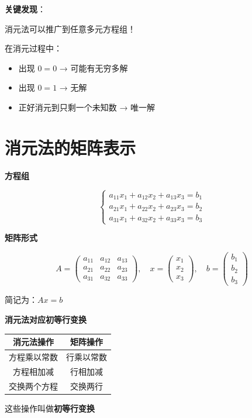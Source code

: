 \documentclass[aspectratio=169,12pt]{beamer}
\begin{document}
\begin{frame}
\pause
\textbf{关键发现}：
\centerline{消元法可以推广到任意多元方程组！}

\bigskip
\pause
在消元过程中：
\begin{itemize}
    \item 出现 $0 = 0$ → 可能有无穷多解
    \item 出现 $0 = 1$ → 无解
    \item 正好消元到只剩一个未知数 → 唯一解
\end{itemize}
\end{frame}

\section{消元法的矩阵表示}

\begin{frame}
\fontsize{10}{12}\selectfont
\centerline{\textbf{方程组}}
\[
\begin{cases}
a_{11}x_1 + a_{12}x_2 + a_{13}x_3 = b_1 \\
a_{21}x_1 + a_{22}x_2 + a_{23}x_3 = b_2 \\
a_{31}x_1 + a_{32}x_2 + a_{33}x_3 = b_3
\end{cases}
\]

\bigskip
\centerline{\textbf{矩阵形式}}
\[
A = \begin{pmatrix}
a_{11} & a_{12} & a_{13} \\
a_{21} & a_{22} & a_{23} \\
a_{31} & a_{32} & a_{33}
\end{pmatrix}, \quad
x = \begin{pmatrix} x_1 \\ x_2 \\ x_3 \end{pmatrix}, \quad
b = \begin{pmatrix} b_1 \\ b_2 \\ b_3 \end{pmatrix}
\]

\centerline{简记为：$Ax = b$}
\end{frame}

\begin{frame}
\fontsize{10}{12}\selectfont
\centerline{\textbf{消元法对应初等行变换}}

\begin{center}
\begin{tabular}{|c|c|}
\hline
消元法操作 & 矩阵操作 \\
\hline
方程乘以常数 & 行乘以常数 \\
\hline
方程相加减 & 行相加减 \\
\hline
交换两个方程 & 交换两行 \\
\hline
\end{tabular}
\end{center}

\pause
\bigskip
\centerline{这些操作叫做\textbf{初等行变换}}
\end{frame}
\end{document}
